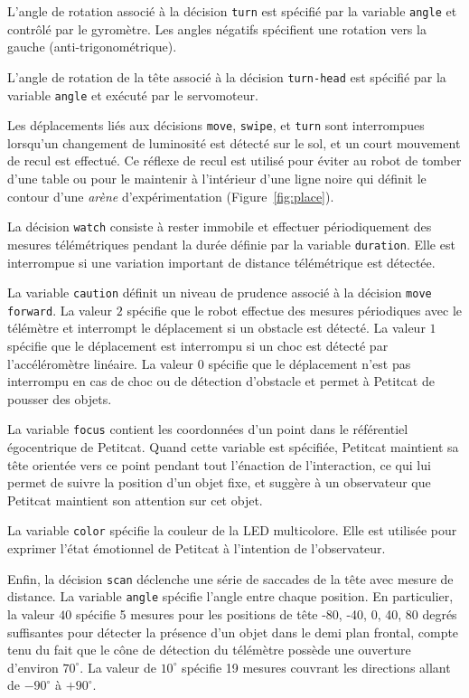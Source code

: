 L'angle de rotation associé à la décision \texttt{turn} est spécifié par la variable \texttt{angle} et contrôlé  par le gyromètre. %
Les angles négatifs spécifient une rotation vers la gauche (anti-trigonométrique). 

L'angle de rotation de la tête associé à la décision \texttt{turn-head} est spécifié par la variable \texttt{angle} et exécuté par le servomoteur. 

Les déplacements liés aux décisions \texttt{move}, \texttt{swipe}, et \texttt{turn} sont interrompues lorsqu'un changement de luminosité est détecté sur le sol, et un court mouvement de recul est effectué.
Ce réflexe de recul est utilisé pour éviter au robot de tomber d'une table ou pour le maintenir à l'intérieur d'une ligne noire qui définit le contour d'une \emph{arène} d'expérimentation (Figure~\ref{fig:place}). 

La décision \texttt{watch} consiste à rester immobile et effectuer périodiquement des mesures télémétriques pendant la durée définie par la variable \texttt{duration}. 
Elle est interrompue si une variation important de distance télémétrique est détectée. 

La variable \texttt{caution} définit un niveau de prudence associé à la décision \texttt{move forward}. 
La valeur $2$ spécifie que le robot effectue des mesures périodiques avec le télémètre et interrompt le déplacement si un obstacle est détecté. 
La valeur $1$ spécifie que le déplacement est interrompu si un choc est détecté par l'accéléromètre linéaire. 
La valeur $0$ spécifie que le déplacement n'est pas interrompu en cas de choc ou de détection d'obstacle et permet à Petitcat de pousser des objets.

La variable \texttt{focus} contient les coordonnées d'un point dans le référentiel égocentrique de Petitcat. 
Quand cette variable est spécifiée, Petitcat maintient sa tête orientée vers ce point pendant tout l'énaction de l'interaction, ce qui lui permet de suivre la position d'un objet fixe, et suggère à un observateur que Petitcat maintient son attention sur cet objet. 

La variable \texttt{color} spécifie la couleur de la LED multicolore. 
Elle est utilisée pour exprimer l'état émotionnel de Petitcat à l'intention de l'observateur. 

Enfin, la décision \texttt{scan} déclenche une série de saccades de la tête avec mesure de distance.
La variable \texttt{angle} spécifie l'angle entre chaque position.
En particulier, la valeur $40$ spécifie 5 mesures pour les positions de tête -80, -40, 0, 40, 80 degrés suffisantes pour détecter la présence d'un objet dans le demi plan frontal, compte tenu du fait que le cône de détection du télémètre possède une ouverture d'environ $70^\circ$. 
La valeur de $10^\circ$ spécifie 19 mesures couvrant les directions allant de $-90^\circ$ à $+90^\circ$.


